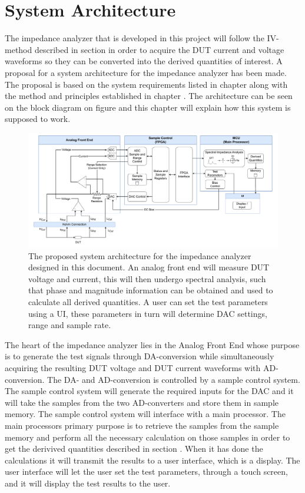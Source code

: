 \chapter{System Architecture} \label{ch:SysArchitecture}

The impedance analyzer that is developed in this project will follow the IV-method described in section  in order to acquire the DUT current and voltage waveforms so they can be converted into the derived quantities of interest. A proposal for a system architecture for the impedance analyzer has been made. The proposal is based on the system requirements listed in chapter  along with the method and principles established in chapter . The architecture can be seen on the block diagram on figure  and this chapter will explain how this system is supposed to work.

\begin{figure}[H]
    \centering
    \includegraphics[clip, trim=18 0 18 0,width=1.0\textwidth]{Sections/6_SystemArchitecture/Figures/SystemArchitecture.pdf}
    \caption{The proposed system architecture for the impedance analyzer designed in this document. An analog front end will measure DUT voltage and current, 
    this will then undergo spectral analysis, such that phase and magnitude information can be obtained and used to calculate all derived quantities. A user can set the test parameters using a UI, these parameters in turn will determine DAC settings, range and sample rate.}
    \label{fig_6_SysArchitecture}
\end{figure}

The heart of the impedance analyzer lies in the Analog Front End whose purpose is to generate the test signals through DA-conversion while simultaneously acquiring the resulting DUT voltage and DUT current waveforms with AD-conversion. The DA- and AD-conversion is controlled by a sample control system. The sample control system will generate the required inputs for the DAC and it will take the samples from the two AD-converters and store them in sample memory. The sample control system will interface with a main processor. The main processors primary purpose is to retrieve the samples from the sample memory and perform all the necessary calculation on those samples in order to get the derivived quantities described in section . When it has done the calculations it will transmit the results to a user interface, which is a display. The user interface will let the user set the test parameters, through a touch screen, and it will display the test results to the user.

